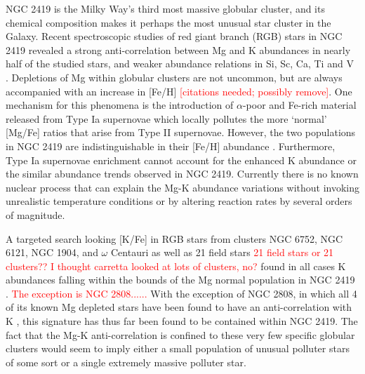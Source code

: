 \documentclass[a4paper,fleqn,usenatbib]{mnras}
\newcommand{\todo}[1]{\textcolor{red}{#1}}
\begin{document}
NGC 2419 is the Milky Way's third most massive globular cluster, and its chemical composition makes it perhaps the most unusual star cluster in the Galaxy. Recent spectroscopic studies of red giant branch (RGB) stars in NGC 2419 revealed a strong anti-correlation between Mg and K abundances in nearly half of the studied stars, and weaker abundance relations in Si, Sc, Ca, Ti and V \citep{mucciarelli2012,cohenkirby2012}. Depletions of Mg within globular clusters are not uncommon, but are always accompanied with an increase in [Fe/H] \todo{[citations needed; possibly remove]}. One mechanism for this phenomena is the introduction of $\alpha$-poor and Fe-rich material released from Type Ia supernovae which locally pollutes the more `normal' [Mg/Fe] ratios that arise from Type II supernovae. However, the two populations in NGC 2419 are indistinguishable in their [Fe/H] abundance \citep{cohenkirby2012}. Furthermore, Type Ia supernovae enrichment cannot account for the enhanced K abundance or the similar  abundance trends observed in NGC 2419. Currently there is no known nuclear process that can explain the Mg-K abundance variations  without invoking unrealistic temperature conditions or by altering reaction rates by several orders of magnitude. 





A  targeted search looking [K/Fe] in RGB stars from clusters NGC 6752, NGC 6121, NGC 1904, and $\omega$ Centauri as well as 21 field stars \todo{21 field stars or 21 clusters?? I thought carretta looked at lots of clusters, no?} found in all cases K abundances falling within the bounds of the Mg normal population in NGC 2419 \citep{carretta2013}. \todo{The exception is NGC 2808......}
With the exception of NGC 2808, in which all 4 of its known Mg depleted stars have been found to have an anti-correlation with K \citep{mucciarelli2015}, this signature has thus far been found to be contained within NGC 2419. The fact that the Mg-K anti-correlation is confined to these very few specific globular clusters would seem to imply either a small population  of unusual polluter stars of some sort or a single extremely massive polluter star.
\end{document}
